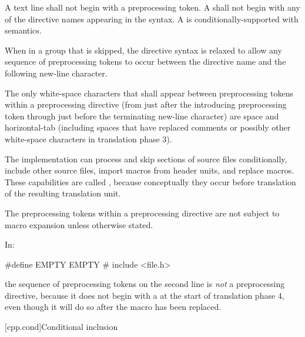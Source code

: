\begin{bnf}
\br
\end{bnf}

\pnum
A text line shall not begin with a \tcode{\#} preprocessing token.
A  shall not begin
with any of the directive names appearing in the syntax.
A  is
conditionally-supported with
semantics.

\pnum
When in a group that is skipped, the directive
syntax is relaxed to allow any sequence of preprocessing tokens to occur between
the directive name and the following new-line character.

\pnum
The only white-space characters that shall appear
between preprocessing tokens
within a preprocessing directive
(from just after the introducing
\tcode{\#}
preprocessing token through just before the terminating new-line character)
are space and horizontal-tab
(including spaces that have replaced comments
or possibly other white-space characters
in translation phase 3).

\pnum
The implementation can
process and skip sections of source files conditionally,
include other source files,
import macros from header units,
and replace macros.
These capabilities are called
,
because conceptually they occur
before translation of the resulting translation unit.

\pnum
The preprocessing tokens within a preprocessing directive
are not subject to macro expansion unless otherwise stated.

\begin{example} In:

\begin{codeblock}
#define EMPTY
EMPTY   #   include <file.h>
\end{codeblock}

the sequence of preprocessing tokens on the second line is \textit{not}
a preprocessing directive, because it does not begin with a \tcode{\#} at the start of
translation phase 4, even though it will do so after the macro 
has been replaced.\end{example}

[cpp.cond]{Conditional inclusion}%
%


